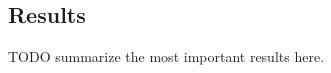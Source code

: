 \subsection{Results} \label{subsec:introduction-results}
TODO summarize the most important results here.




